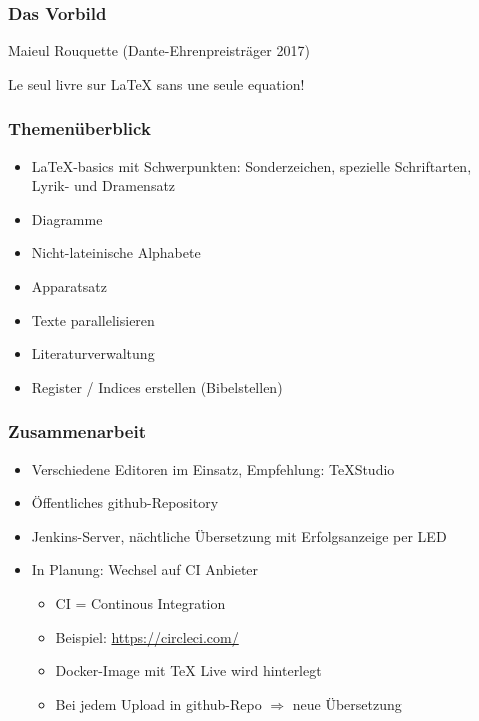 \documentclass[12pt,ngerman]{beamer}
\begin{document}
\begin{frame}
  \frametitle{Das Vorbild}

  Maieul Rouquette (Dante-Ehrenpreisträger 2017)

  Le seul livre sur \LaTeX{} sans une seule equation!
\end{frame}


\begin{frame}
\frametitle{Themenüberblick}

\begin{itemize}
\item \LaTeX-basics mit Schwerpunkten: Sonderzeichen, spezielle Schriftarten, Lyrik- und Dramensatz
\item Diagramme
\item Nicht-lateinische Alphabete
\item Apparatsatz
\item Texte parallelisieren
\item Literaturverwaltung
\item Register / Indices erstellen (Bibelstellen)
\end{itemize}
\end{frame}


\begin{frame}
\frametitle{Zusammenarbeit}

\begin{itemize}
\item Verschiedene Editoren im Einsatz, Empfehlung: TeXStudio
\item Öffentliches github-Repository
\item Jenkins-Server, nächtliche Übersetzung mit Erfolgsanzeige per LED
\item In Planung: Wechsel auf CI Anbieter

\begin{itemize}
	\item CI = Continous Integration
	\item Beispiel: \url{https://circleci.com/}
	\item Docker-Image mit TeX Live wird hinterlegt
	\item Bei jedem Upload in github-Repo $\Rightarrow$ neue Übersetzung
\end{itemize}

\end{itemize}
\end{frame}
\end{document}
